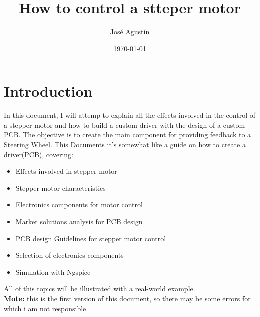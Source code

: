 \documentclass{report}
\title{How to control a stteper motor}
\author{José Agustín}
\date{\today}
\begin{document}
\maketitle 

\tableofcontents 

\chapter{Introduction}
In this document, I will attemp to explain all the effects involved in the control
of a stepper motor and how to build a custom driver with the design of a custom PCB.
The objective is to create the main component for providing feedback to a Steering Wheel.
This Documents it's somewhat like a guide on how to create a driver(PCB), covering:
\begin{itemize}
\item Effects involved in stepper motor
\item Stepper motor characteristics
\item Electronics components for motor control
\item Market solutions analysis for PCB design
\item PCB design Guidelines for stepper motor control
\item Selection of electronics components
\item Simulation with Ngspice
\end{itemize}
All of this topics will be illustrated with a real-world example.\\
\textbf{Mote:} this is the first version of this document, so there may be 
some errors for which i am not responsible
\end{document}
